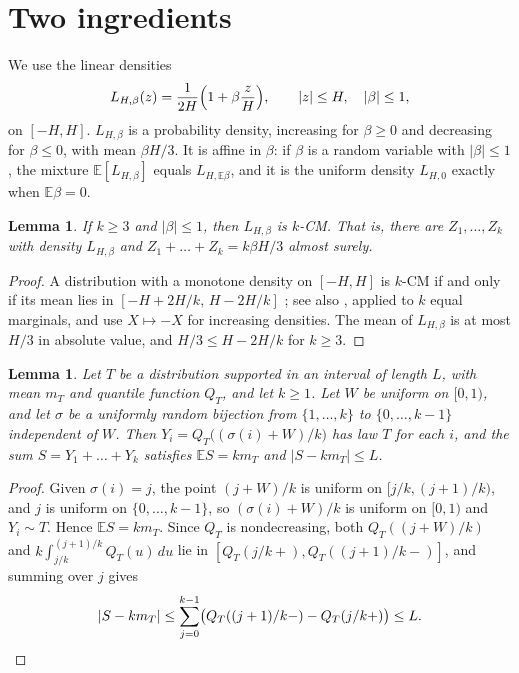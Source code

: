 ﻿\documentclass[11pt]{amsart}
\newtheorem{lemma}[theorem]{Lemma}
\theoremstyle{remark}
\newcommand{\E}{\mathbb{E}}
\begin{document}
\section{Two ingredients}

We use the linear densities
\[
L_{H,\beta}(z)=\frac{1}{2H}\Bigl(1+\beta\frac zH\Bigr),\qquad |z|\le H,\quad |\beta|\le1,
\]
on $[-H,H]$. $L_{H,\beta}$ is a probability density, increasing for $\beta\ge0$ and decreasing for $\beta\le0$, with mean $\beta H/3$. It is affine in $\beta$: if $\beta$ is a random variable with $|\beta|\le1$, the mixture $\E[L_{H,\beta}]$ equals $L_{H,\E\beta}$, and it is the uniform density $L_{H,0}$ exactly when $\E\beta=0$.

\begin{lemma}\label{lem:tilt}
If $k\ge3$ and $|\beta|\le1$, then $L_{H,\beta}$ is $k$-CM. That is, there are $Z_1,\dots,Z_k$ with density $L_{H,\beta}$ and $Z_1+\dots+Z_k=k\beta H/3$ almost surely.
\end{lemma}

\begin{proof}
A distribution with a monotone density on $[-H,H]$ is $k$-CM if and only if its mean lies in $[-H+2H/k,\,H-2H/k]$ \cite{WW11}; see also \cite[Theorem~3.2]{WW16}, applied to $k$ equal marginals, and use $X\mapsto-X$ for increasing densities. The mean of $L_{H,\beta}$ is at most $H/3$ in absolute value, and $H/3\le H-2H/k$ for $k\ge3$.
\end{proof}

\begin{lemma}\label{lem:grid}
Let $T$ be a distribution supported in an interval of length $L$, with mean $m_T$ and quantile function $Q_T$, and let $k\ge1$. Let $W$ be uniform on $[0,1)$, and let $\sigma$ be a uniformly random bijection from $\{1,\dots,k\}$ to $\{0,\dots,k-1\}$ independent of $W$. Then $Y_i=Q_T\bigl((\sigma(i)+W)/k\bigr)$ has law $T$ for each $i$, and the sum $S=Y_1+\dots+Y_k$ satisfies $\E S=km_T$ and $|S-km_T|\le L$.
\end{lemma}

\begin{proof}
Given $\sigma(i)=j$, the point $(j+W)/k$ is uniform on $[j/k,(j+1)/k)$, and $j$ is uniform on $\{0,\dots,k-1\}$, so $(\sigma(i)+W)/k$ is uniform on $[0,1)$ and $Y_i\sim T$. Hence $\E S=km_T$. Since $Q_T$ is nondecreasing, both $Q_T((j+W)/k)$ and $k\int_{j/k}^{(j+1)/k}Q_T(u)\,du$ lie in $[Q_T(j/k+),Q_T((j+1)/k-)]$, and summing over $j$ gives
\[
|S-km_T|\le\sum_{j=0}^{k-1}\bigl(Q_T((j+1)/k-)-Q_T(j/k+)\bigr)\le L. \qedhere
\]
\end{proof}
\end{document}
